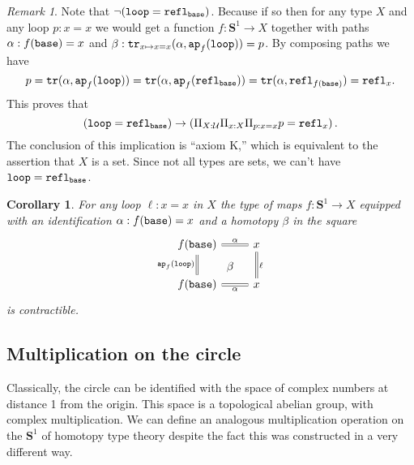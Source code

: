 \documentclass{amsart}
\theoremstyle{theorem}
\newtheorem*{cor}{Corollary}
\theoremstyle{definition}
\theoremstyle{remark}
\newtheorem*{rmk}{Remark}
\newcommand{\0}{\mathbbe{0}}
\newcommand{\1}{\mathbbe{1}}
\newcommand{\2}{\mathbbe{2}}
\newcommand{\3}{\mathbbe{3}}
\newcommand{\4}{\mathbbe{4}}
\newcommand{\term}[1]{{\textup{\texttt{#1}}}}
\newcommand{\refl}{\term{refl}}
\newcommand{\ap}{\term{ap}}
\newcommand{\tr}{\term{tr}}
\newcommand{\UU}{{\mathcal{U}}}
\newcommand{\Sone}{\mathbf{S}^1}
\newcommand{\base}{\term{base}}
\newcommand{\lloop}{\term{loop}}
\begin{document}
  \begin{rmk}
    Note that $\neg(\lloop = \refl_\base)$. Because if so then for any type $X$ and any loop $p : x = x$ we would get a function $f : \Sone \to X$ together with paths $\alpha : f(\base) = x$ and $\beta : \tr_{x \mapsto x = x}(\alpha, \ap_f(\lloop)) = p$. By composing paths we have
    \[ p = \tr(\alpha,\ap_f(\lloop)) = \tr(\alpha,\ap_f(\refl_\base)) = \tr(\alpha,\refl_{f(\base)}) = \refl_x.\]
    This proves that
    \[
    (\lloop = \refl_\base ) \to \left(\Pi_{X: \UU}\Pi_{x : X}\Pi_{p : x = x} p = \refl_x  \right).
    \]
   The conclusion of this implication is ``axiom K,'' which is equivalent to the assertion that $X$ is a set. Since not all types are sets, we can't have $\lloop = \refl_\base$.
  \end{rmk}
  

  \begin{cor} For any loop $\ell : x = x$ in $X$ the type of maps $f : \Sone \to X$ equipped with an identification $\alpha : f(\base) =x$ and a homotopy $\beta$ in the square
    \[
      \begin{tikzcd}
        f(\base)\arrow[dr, phantom, "\beta"] \arrow[d, equals, "\ap_f(\lloop)"'] \arrow[r, equals, "\alpha"] & x \arrow[d, "\ell", equals] \\ f(\base) \arrow[r, equals, "\alpha"'] & x
      \end{tikzcd}\]
      is contractible.
    \end{cor}

    \subsection*{Multiplication on the circle}

Classically, the circle can be identified with the space of complex numbers at distance 1 from the origin. This space is a topological abelian group, with complex multiplication. We can define an analogous multiplication operation on the $\Sone$ of homotopy type theory despite the fact this was constructed in a very different way.
\end{document}
